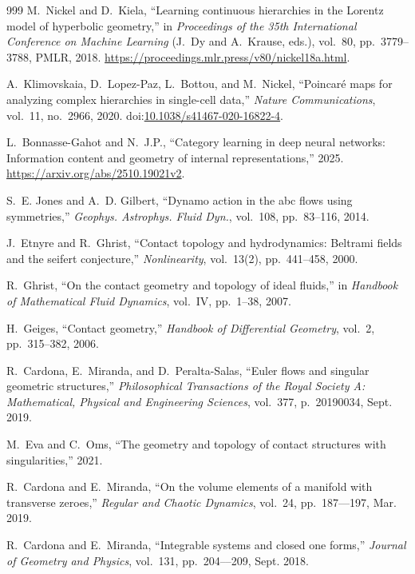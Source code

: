 \documentclass[10pt,a4paper]{article}
\begin{document}
\begin{thebibliography}{999}
M.~Nickel and D.~Kiela, ``Learning continuous hierarchies in the {L}orentz
  model of hyperbolic geometry,'' in {\em Proceedings of the 35th International
  Conference on Machine Learning} (J.~Dy and A.~Krause, eds.), vol.~80,
  pp.~3779--3788, PMLR, 2018.
\newblock \url{https://proceedings.mlr.press/v80/nickel18a.html}.

A.~Klimovskaia, D.~Lopez-Paz, L.~Bottou, and M.~Nickel, ``Poincar\'e maps for
  analyzing complex hierarchies in single-cell data,'' {\em Nature
  Communications}, vol.~11, no.~2966, 2020.
\newblock
  doi:\href{https://doi.org/10.1038/s41467-020-16822-4}{10.1038/s41467-020-16822-4}.

L.~Bonnasse-Gahot and N.~J.P., ``Category learning in deep neural networks:
  Information content and geometry of internal representations,'' 2025.
\newblock \url{https://arxiv.org/abs/2510.19021v2}.

S.~E. Jones and A.~D. Gilbert, ``Dynamo action in the abc flows using
  symmetries,'' {\em Geophys. Astrophys. Fluid Dyn.}, vol.~108, pp.~83--116,
  2014.

J.~Etnyre and R.~Ghrist, ``Contact topology and hydrodynamics: Beltrami fields
  and the seifert conjecture,'' {\em Nonlinearity}, vol.~13(2), pp.~441--458,
  2000.

R.~Ghrist, ``On the contact geometry and topology of ideal fluids,'' in {\em
  Handbook of Mathematical Fluid Dynamics}, vol.~IV, pp.~1--38, 2007.

H.~Geiges, ``Contact geometry,'' {\em Handbook of Differential Geometry},
  vol.~2, pp.~315--382, 2006.

R.~Cardona, E.~Miranda, and D.~Peralta-Salas, ``Euler flows and singular
  geometric structures,'' {\em Philosophical Transactions of the Royal Society
  A: Mathematical, Physical and Engineering Sciences}, vol.~377, p.~20190034,
  Sept. 2019.

M.~Eva and C.~Oms, ``The geometry and topology of contact structures with
  singularities,'' 2021.

R.~Cardona and E.~Miranda, ``On the volume elements of a manifold with
  transverse zeroes,'' {\em Regular and Chaotic Dynamics}, vol.~24,
  pp.~187–--197, Mar. 2019.

R.~Cardona and E.~Miranda, ``Integrable systems and closed one forms,'' {\em
  Journal of Geometry and Physics}, vol.~131, pp.~204–--209, Sept. 2018.


\end{thebibliography}
\end{document}
